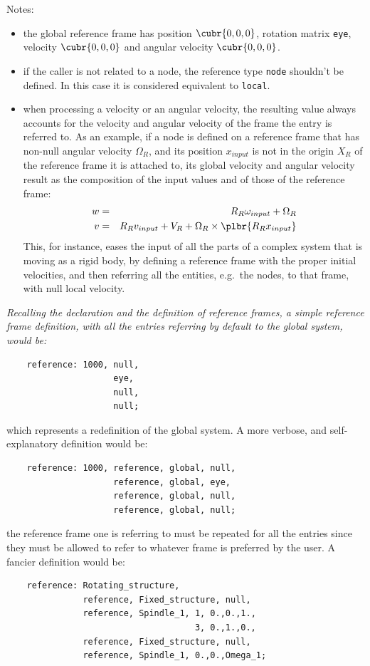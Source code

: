 \documentclass[10pt,dvips]{report}
\begin{document}
Notes: 
\begin{itemize}
    \item the global reference frame has position $ \cubr{0, 0, 0} $,
    rotation matrix {\tt eye}, velocity $ \cubr{0, 0, 0} $ and angular
    velocity $ \cubr{0, 0, 0} $.
    \item if the caller is not related to a node, the reference type
    {\tt node} shouldn't be defined. 
    In this case it is considered equivalent to {\tt local}.
    \item when processing a velocity or an angular velocity, the resulting
    value always accounts for the velocity and angular velocity of the frame
    the entry is referred to. 
    As an example, if a node is defined on a reference frame that has
    non-null angular velocity $ \Omega_R $, and its position 
    $ x_{input} $ is not in the origin $ X_R $ of the reference frame
    it is attached to, its global velocity and angular velocity result
    as the composition of the input values and of those of the reference 
    frame:
    \begin{eqnarray*}    
        w & = & R_R\omega_{input}+\Omega_R \\
	v & = & R_Rv_{input}+V_R+\Omega_R\times\plbr{R_Rx_{input}}
    \end{eqnarray*}
    This, for instance, eases the input of all the parts of a complex system
    that is moving as a rigid body, by defining a reference frame with the
    proper initial velocities, and then referring all the entities, e.g.\ the 
    nodes, to that frame, with null local velocity.
\end{itemize}  
{\em
    Recalling the declaration and the definition of reference frames,
    a simple reference frame definition, with all the entries referring 
    by default to the global system, would be:
    \begin{verbatim}
    reference: 1000, null,
                     eye,
                     null,
                     null;			 
    \end{verbatim}
    which represents a redefinition of the global system.
    A more verbose, and self-explanatory definition would be:
    \begin{verbatim}
    reference: 1000, reference, global, null,
                     reference, global, eye,
                     reference, global, null,
                     reference, global, null;			 
    \end{verbatim}
    the reference frame one is referring to must be repeated for all the entries
    since they must be allowed to refer to whatever frame is preferred 
    by the user.
    A fancier definition would be:
    \begin{verbatim}
    reference: Rotating_structure, 
               reference, Fixed_structure, null,
               reference, Spindle_1, 1, 0.,0.,1., 
                                     3, 0.,1.,0.,
               reference, Fixed_structure, null,
               reference, Spindle_1, 0.,0.,Omega_1;
    \end{verbatim}
}
\end{document}
